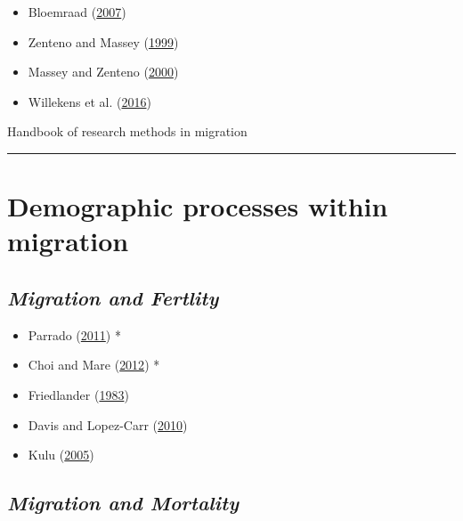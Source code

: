 \documentclass[
]{article}
\providecommand{\tightlist}{%
  \setlength{\itemsep}{0pt}\setlength{\parskip}{0pt}}
\begin{document}
\begin{itemize}
\tightlist
\item
  Bloemraad (\protect\hyperlink{ref-bloemraad2007puzzles}{2007})
\item
  Zenteno and Massey
  (\protect\hyperlink{ref-zenteno1999especificidad}{1999})
\item
  Massey and Zenteno
  (\protect\hyperlink{ref-massey2000validation}{2000})
\item
  Willekens et al.
  (\protect\hyperlink{ref-willekens2016international}{2016})
\end{itemize}

Handbook of research methods in migration

\begin{center}\rule{0.5\linewidth}{0.5pt}\end{center}

\hypertarget{demographic-processes-within-migration}{%
\section{\texorpdfstring{\textbf{Demographic processes within
migration}}{Demographic processes within migration}}\label{demographic-processes-within-migration}}

\hypertarget{migration-and-fertlity}{%
\subsection{\texorpdfstring{\emph{Migration and
Fertlity}}{Migration and Fertlity}}\label{migration-and-fertlity}}

\begin{itemize}
\tightlist
\item
  Parrado (\protect\hyperlink{ref-parrado2011high}{2011}) *
\item
  Choi and Mare (\protect\hyperlink{ref-choi2012international}{2012}) *
\item
  Friedlander (\protect\hyperlink{ref-friedlander1983demographic}{1983})
\item
  Davis and Lopez-Carr (\protect\hyperlink{ref-davis2010effects}{2010})
\item
  Kulu (\protect\hyperlink{ref-kulu2005migration}{2005})
\end{itemize}

\hypertarget{migration-and-mortality}{%
\subsection{\texorpdfstring{\emph{Migration and Mortality
}}{Migration and Mortality }}\label{migration-and-mortality}}
\end{document}
